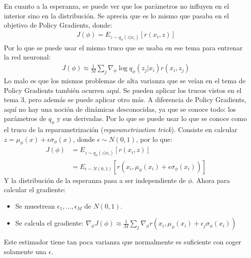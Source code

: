 En cuanto a la esperanza, se puede ver que los parámetros no influyen en el interior sino en la
distribución. Se aprecia que es lo mismo que pasaba en el objetivo de Policy Gradients, donde:
\begin{align}
J ( \phi ) = E _ { z \sim q _ { \phi } ( z | x _ { i } ) } [ r ( x _ { i } , z ) ]
\end{align}
Por lo que se puede usar el mismo truco que se usaba en ese tema para entrenar la red
neuronal:
\begin{align}
J ( \phi ) \approx \frac { 1 } { M } \sum _ { j } \nabla _ { \phi } \operatorname { log } q _ { \phi } ( z _ { j } | x _ { i } ) r ( x _ { i } , z _ { j } )
\end{align}
Lo malo es que los mismos problemas de alta varianza que se veían en el tema de Policy Gradients
también ocurren aquí. Se pueden aplicar los trucos vistos en el tema 3, pero además se puede
aplicar otro más. A diferencia de Policy Gradients, aquí no hay una noción de dinámicas
desconocidas, ya que se conoce todo: los parámetros de $q_\phi$ y sus derivadas. Por lo
que se puede usar lo que se conoce como el truco de la reparametrización
(\textit{reparametrization trick}). Consiste en calcular
$z=\mu_\phi(x)+\epsilon\sigma_\phi(x)$, donde $\epsilon\sim N(0,1)$, por lo que:
\begin{align}
    J ( \phi ) &= E _ { z \sim q _ { \phi } ( z | x _ { i } ) } [ r ( x _ { i } , z ) ]\\
               &= E _ { \epsilon \sim N ( 0,1 ) } [ r ( x _ { i } , \mu _ { \phi } ( x _ { i } ) + \epsilon \sigma _ { \phi } ( x _ { i } ) ) ]
\end{align}
Y la distribución de la esperanza pasa a ser independiente de $\phi$. Ahora para calcular el
gradiente:
\begin{itemize}
    \item Se muestrean $\epsilon_1,\ldots,\epsilon_M$ de $N(0,1)$.
    \item Se calcula el gradiente: 
        $ \nabla _ { \phi } J ( \phi ) \approx \frac { 1 } { M } \sum _ { j } \nabla _ { \phi } r ( x _ { i } , \mu _ { \phi } ( x _ { i } ) + \epsilon _ { j } \sigma _ { \phi } ( x _ { i } ) ) $
\end{itemize}
Este estimador tiene tan poca varianza que normalmente es suficiente con coger solamente una
$\epsilon$.

